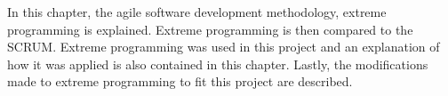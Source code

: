 In this chapter, the agile software development methodology, extreme programming is explained. Extreme programming is then compared to the  SCRUM. Extreme programming was used in this project and an explanation of how it was applied is also contained in this chapter. Lastly, the modifications made to extreme programming to fit this project are described.

